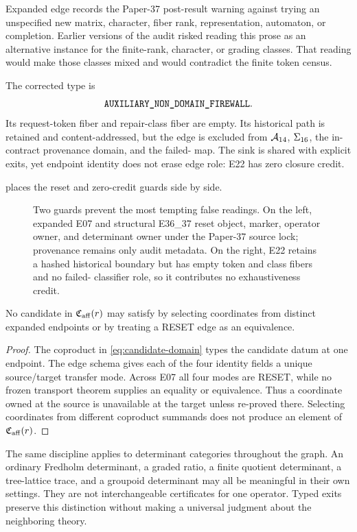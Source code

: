 Expanded edge  records the Paper-37 post-result warning
against trying an unspecified new matrix, character, fiber rank,
representation, automaton, or completion.  Earlier versions of the audit risked
reading this prose as an alternative instance for the finite-rank, character,
or grading classes.  That reading would make those classes mixed and would
contradict the finite token census.

The corrected type is
\[
\texttt{AUXILIARY\_NON\_DOMAIN\_FIREWALL}.
\]
Its request-token fiber and repair-class fiber are empty.  Its historical path
is retained and content-addressed, but the edge is excluded from $\mathcal{A}_{14}$,
$\Sigma_{16}$, the in-contract provenance domain, and the failed-\Good{} map.
The sink  is shared with explicit exits, yet endpoint identity does
not erase edge role: E22 has zero closure credit.

 places the reset and zero-credit guards side by side.

\begin{figure}[H]
  \centering
  \resizebox{0.96\textwidth}{!}{}
  \caption{Two guards prevent the most tempting false readings.  On the left,
  expanded E07 and structural E36\_37 reset object, marker, operator owner, and
  determinant owner under the Paper-37 source lock; provenance remains only
  audit metadata.  On the right, E22 retains a hashed historical boundary but
  has empty token and class fibers and no failed-\Good{} classifier role, so it
  contributes no exhaustiveness credit.}
  \label{fig:firewalls}
\end{figure}

\begin{proposition}
\label{prop:no-assembly}
No candidate in $\mathfrak{C}_{\mathrm{aff}}(r)$ may satisfy \Good{} by selecting coordinates from
distinct expanded endpoints or by treating a RESET edge as an equivalence.
\end{proposition}

\begin{proof}
The coproduct in \cref{eq:candidate-domain} types the candidate datum at one
endpoint.  The edge schema gives each of the four identity fields a unique
source/target transfer mode.  Across E07 all four modes are RESET, while no
frozen transport theorem supplies an equality or equivalence.  Thus a
coordinate owned at the source is unavailable at the target unless re-proved
there.  Selecting coordinates from different coproduct summands does not
produce an element of $\mathfrak{C}_{\mathrm{aff}}(r)$.
\end{proof}

The same discipline applies to determinant categories throughout the graph.
An ordinary Fredholm determinant, a graded ratio, a finite quotient determinant,
a tree-lattice trace, and a groupoid determinant may all be meaningful in their
own settings.  They are not interchangeable certificates for one operator.
Typed exits preserve this distinction without making a universal judgment
about the neighboring theory.
